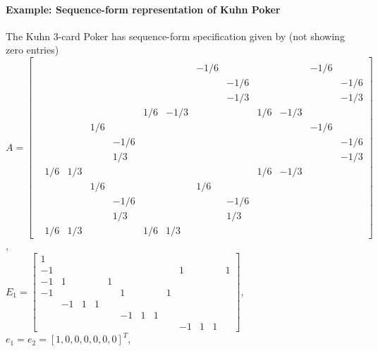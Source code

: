 \documentclass{article} %
\begin{document}
\paragraph{Example: Sequence-form representation of Kuhn Poker}
\label{sec:kuhn_sf}
The Kuhn 3-card Poker has sequence-form specification given by (not showing zero entries)\\
$A = \left[\begin{array}{ccccccccccccc}
  &   &   &   &   &   &   &   &   &   &   &   &  \\
  &   &   &   &   &   &   & -1 / 6 &   &   &   & -1 / 6 &  \\
  &   &   &   &   &   &   &   & -1 / 6 &   &   &   & -1 / 6\\
  &   &   &   &   &   &   &   & -1 / 3 &   &   &   & -1 / 3\\
  &   &   &   &   & 1 / 6 & -1 / 3 &   &   & 1 / 6 & -1 / 3 &   &  \\
  &   &   & 1 / 6 &   &   &   &   &   &   &   & -1 / 6 &  \\
  &   &   &   & -1 / 6 &   &   &   &   &   &   &   & -1 / 6\\
  &   &   &   & 1 / 3 &   &   &   &   &   &   &   & -1 / 3\\
  & 1 / 6 & 1 / 3 &   &   &   &   &   &   & 1 / 6 & -1 / 3 &   &  \\
  &   &   & 1 / 6 &   &   &   & 1 / 6 &   &   &   &   &  \\
  &   &   &   & -1 / 6 &   &   &   & -1 / 6 &   &   &   &  \\
  &   &   &   & 1 / 3 &   &   &   & 1 / 3 &   &   &   &  \\
  & 1 / 6 & 1 / 3 &   &   & 1 / 6 & 1 / 3 &   &   &   &   &   &  
\end{array}\right]$,\\
$E_1 = \left[\begin{array}{ccccccccccccc}
1 &   &   &   &   &   &   &   &   &   &   &   &  \\
-1 &   &   &   &   &   &   &   &   & 1 &   &   & 1\\
-1 & 1 &   &   & 1 &   &   &   &   &   &   &   &  \\
-1 &   &   &   &   & 1 &   &   & 1 &   &   &   &  \\
  & -1 & 1 & 1 &   &   &   &   &   &   &   &   &  \\
  &   &   &   &   & -1 & 1 & 1 &   &   &   &   &  \\
  &   &   &   &   &   &   &   &   & -1 & 1 & 1 &  
\end{array}\right]$, $e_1 = e_2 = [1, 0, 0, 0, 0, 0, 0]^T$,\\
\end{document}
